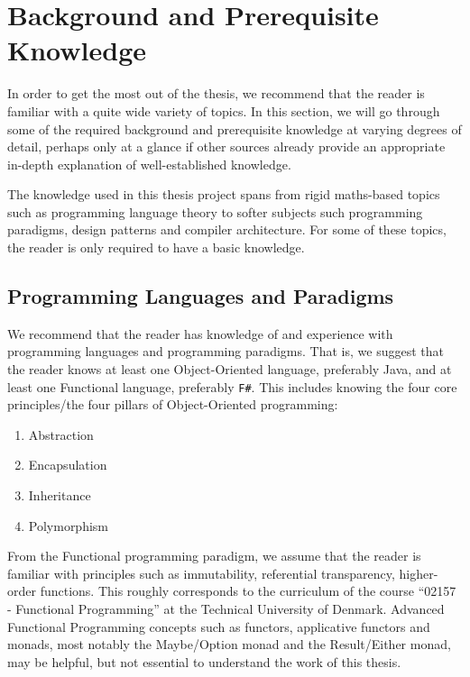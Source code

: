 \chapter{Background and Prerequisite Knowledge} \label{sec:background}

In order to get the most out of the thesis, we recommend that the reader is familiar with a quite wide variety of topics.
In this section, we will go through some of the required background and prerequisite knowledge at varying degrees of detail, perhaps only at a glance if 
other sources already provide an appropriate in-depth explanation of well-established knowledge.

The knowledge used in this thesis project spans from rigid maths-based topics such as programming language theory to softer subjects such 
programming paradigms, design patterns and compiler architecture. For some of these topics, the reader is only required to have a basic knowledge. 

\section{Programming Languages and Paradigms}

We recommend that the reader has knowledge of and experience with programming languages and programming paradigms.
That is, we suggest that the reader knows at least one Object-Oriented language, preferably Java, and at least one Functional language,
preferably \texttt{F\#}. This includes knowing the four core principles/the four pillars of Object-Oriented programming:

\begin{enumerate}
\item Abstraction
\item Encapsulation
\item Inheritance
\item Polymorphism
\end{enumerate}

From the Functional programming paradigm, we assume that the reader is familiar with principles such as immutability, referential transparency,
higher-order functions. This roughly corresponds to the curriculum of the course ``02157 - Functional Programming'' at the Technical University of 
Denmark. Advanced Functional Programming concepts such as functors, applicative functors and monads, most notably the Maybe/Option monad and
the Result/Either monad, may be helpful, but not essential to understand the work of this thesis. 

